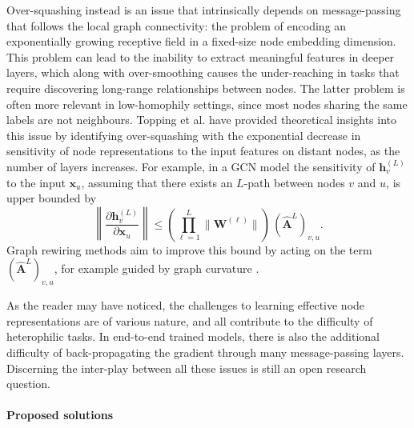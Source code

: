 \documentclass[final,5p,times,twocolumn]{elsarticle}
\begin{document}
Over-squashing instead is an issue that intrinsically depends on message-passing that follows the local graph connectivity: the problem of encoding an exponentially growing receptive field \citep{Micheli2009} in a fixed-size node embedding dimension.
This problem can lead to the inability to extract meaningful features in deeper layers, which along with over-smoothing causes the under-reaching in tasks that require discovering long-range relationships between nodes.
The latter problem is often more relevant in low-homophily settings, since most nodes sharing the same labels are not neighbours.
Topping et al. \cite{Topping2022} have provided theoretical insights into this issue by identifying over-squashing with the exponential decrease in sensitivity of node representations to the input features on distant nodes, as the number of layers increases.
For example, in a GCN model \cite{Kipf2017} the sensitivity of $\mathbf{h}_v^{(L)}$ to the input $\mathbf{x}_{u}$, assuming that there exists an $L$-path between nodes $v$ and $u$, is upper bounded by
\begin{equation}\label{eq:sensitivity}
	\left\lVert \frac{\partial \mathbf{h}_v^{(L)}}{\partial \mathbf{x}_{u}} \right\rVert \leq \left(\prod_{\ell=1}^{L} \lVert \mathbf{W}^{(\ell)} \rVert \right)\, (\mathbf{\hat{A}}^{L})_{v,u}.
\end{equation}
Graph rewiring methods aim to improve this bound by acting on the term $(\mathbf{\hat{A}}^{L})_{v,u}$, for example guided by graph curvature \cite{Topping2022}.

As the reader may have noticed, the challenges to learning effective node representations are of various nature, and all contribute to the difficulty of heterophilic tasks.
In end-to-end trained models, there is also the additional difficulty of back-propagating the gradient through many message-passing layers.
Discerning the inter-play between all these issues is still an open research question.

\paragraph{Proposed solutions}
\end{document}
